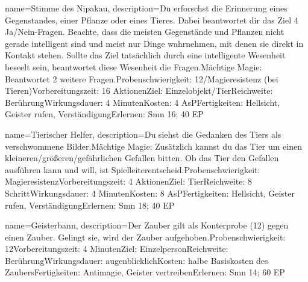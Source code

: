 {
    name={Stimme des Nipakau},
    description={Du erforschst die Erinnerung eines Gegenstandes, einer Pflanze oder eines Tieres. Dabei beantwortet dir das Ziel 4 Ja/Nein-Fragen. Beachte, dass die meisten Gegenstände und Pflanzen nicht gerade intelligent sind und meist nur Dinge wahrnehmen, mit denen sie direkt in Kontakt stehen. Sollte das Ziel tatsächlich durch eine intelligente Wesenheit beseelt sein, beantwortet diese Wesenheit die Fragen.\newline Mächtige Magie: Beantwortet 2 weitere Fragen.\newline Probenschwierigkeit: 12/Magieresistenz (bei Tieren)\newline Vorbereitungszeit: 16 Aktionen\newline Ziel: Einzelobjekt/Tier\newline Reichweite: Berührung\newline Wirkungsdauer: 4 Minuten\newline Kosten: 4 AsP\newline Fertigkeiten: Hellsicht, Geister rufen, Verständigung\newline Erlernen: Smn 16; 40 EP}
}


{
    name={Tierischer Helfer},
    description={Du siehst die Gedanken des Tiers als verschwommene Bilder.\newline Mächtige Magie: Zusätzlich kannst du das Tier um einen kleineren/größeren/gefährlichen Gefallen bitten. Ob das Tier den Gefallen ausführen kann und will, ist Spielleiterentscheid.\newline Probenschwierigkeit: Magieresistenz\newline Vorbereitungszeit: 4 Aktionen\newline Ziel: Tier\newline Reichweite: 8 Schritt\newline Wirkungsdauer: 4 Minuten\newline Kosten: 8 AsP\newline Fertigkeiten: Hellsicht, Geister rufen, Verständigung\newline Erlernen: Smn 18; 40 EP}
}


{
    name={Geisterbann},
    description={Der Zauber gilt als Konterprobe (12) gegen einen Zauber. Gelingt sie, wird der Zauber aufgehoben.\newline Probenschwierigkeit: 12\newline Vorbereitungszeit: 4 Minuten\newline Ziel: Einzelperson\newline Reichweite: Berührung\newline Wirkungsdauer: augenblicklich\newline Kosten: halbe Basiskosten des Zaubers\newline Fertigkeiten: Antimagie, Geister vertreiben\newline Erlernen: Smn 14; 60 EP}
}


